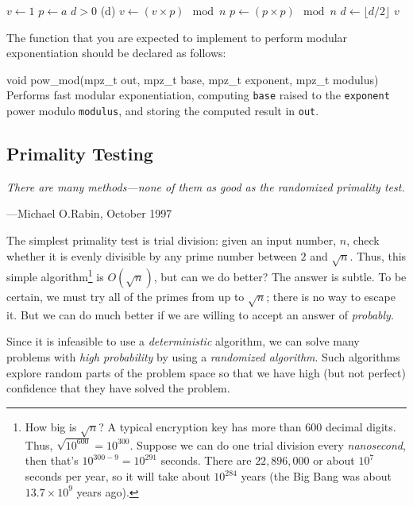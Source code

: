 \begin{codebox}
  \li $v \gets 1$
  \li $p \gets a$
  \li \While $d > 0$
  \li \Then \If {}(d)
  \li       \Then $v \gets (v \times p) \mod n$ \End
  \li       $p \gets (p \times p) \mod n$
  \li       $d \gets \lfloor d / 2 \rfloor$
      \End
  \li \Return $v$
\end{codebox}

The function that you are expected to implement to perform modular
exponentiation should be declared as follows:

\begin{funcdoc}{void pow\_mod(mpz\_t out, mpz\_t base, mpz\_t exponent,
  mpz\_t modulus)}
  Performs fast modular exponentiation, computing \texttt{base} raised
  to the \texttt{exponent} power modulo \texttt{modulus}, and storing
  the computed result in \texttt{out}.
\end{funcdoc}

\subsection{Primality Testing}
\textwidth
\epigraph{\emph{There are many methods---none of them as good as the randomized primality test.}}{---Michael O.\space Rabin, October 1997}


\noindent
The simplest primality test is trial division: given an input number,
$n$, check whether it is evenly divisible by any prime number between
$2$ and $\sqrt{n}$. Thus, this simple algorithm\footnote{
How big is $\sqrt{n}$? A typical encryption key has more than $600$ decimal digits. Thus,
$\sqrt{10^{600}}=10^{300}$.
Suppose we can do one trial division every \emph{nanosecond}, then that's $10^{300-9} = 10^{291}$ seconds. There are $22,896,000$ or about $10^7$ seconds per year, so it will take about $10^{284}$ years (the Big Bang was about $13.7\times 10^{9}$ years ago).
}
is $O(\sqrt{n})$,
but can we do better? The answer is subtle. To be certain,
we must try all of the primes from up to $\sqrt{n}$; there is no
way to escape it. But we can do much better if we are willing to
accept an answer of \emph{probably}.

Since it is infeasible to use a \emph{deterministic} algorithm, we
can solve many problems with \emph{high probability} by using a
\emph{randomized algorithm}. Such algorithms explore random parts
of the problem space so that we have high (but not perfect) confidence
that they have solved the problem.

